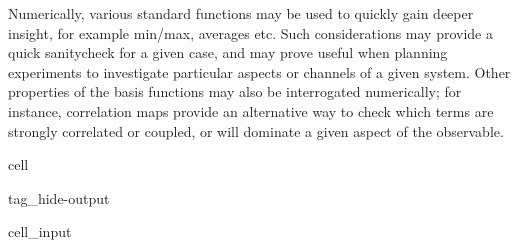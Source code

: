 \documentclass[letterpaper,table,10pt,english]{jupyterBook}
\begin{document}
\sphinxAtStartPar
Numerically, various standard functions may be used to quickly gain deeper insight, for example min/max, averages etc. Such considerations may provide a quick sanity\sphinxhyphen{}check for a given case, and may prove useful when planning experiments to investigate particular aspects or channels of a given system. Other properties of the basis functions may also be interrogated numerically; for instance, correlation maps provide an alternative way to check which terms are strongly correlated or coupled, or will dominate a given aspect of the observable.

\begin{sphinxuseclass}{cell}
\begin{sphinxuseclass}{tag_hide-output}\begin{sphinxVerbatimInput}

\begin{sphinxuseclass}{cell_input}
\begin{sphinxVerbatim}[commandchars=\\\{\}]

    

  \PYG{p}{[}\PYG{p}{]}
  \PYG{p}{[}\PYG{p}{]}

    

\end{sphinxVerbatim}

\end{sphinxuseclass}\end{sphinxVerbatimInput}

\end{sphinxuseclass}
\end{sphinxuseclass}
\end{document}
